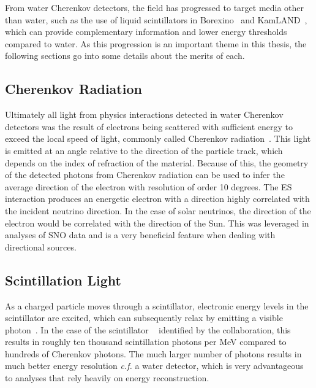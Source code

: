 From water Cherenkov detectors, the field has progressed to target media other than water, such as the use of liquid scintillators in Borexino~\cite{borexino} and KamLAND~\cite{kamland}, which can provide complementary information and lower energy thresholds compared to water.
As this progression is an important theme in this thesis, the following sections go into some details about the merits of each.

\subsection{Cherenkov Radiation}

Ultimately all light from physics interactions detected in water Cherenkov detectors was the result of electrons being scattered with sufficient energy to exceed the local speed of light, commonly called Cherenkov radiation~\cite{cherenkov}.
This light is emitted at an angle relative to the direction of the particle track, which depends on the index of refraction of the material.
Because of this, the geometry of the detected photons from Cherenkov radiation can be used to infer the average direction of the electron with resolution of order 10 degrees.
The ES interaction produces an energetic electron with a direction highly correlated with the incident neutrino direction.
In the case of solar neutrinos, the direction of the electron would be correlated with the direction of the Sun.
This was leveraged in analyses of SNO data and is a very beneficial feature when dealing with directional sources.

\subsection{Scintillation Light}

As a charged particle moves through a scintillator, electronic energy levels in the scintillator are excited, which can subsequently relax by emitting a visible photon~\cite{birks}.
In the case of the scintillator {\labppo}~\cite{snop_labppo} identified by the {\snop} collaboration, this results in roughly ten thousand scintillation photons per MeV compared to hundreds of Cherenkov photons.
The much larger number of photons results in much better energy resolution \textit{c.f.} a water detector, which is very advantageous to analyses that rely heavily on energy reconstruction.

